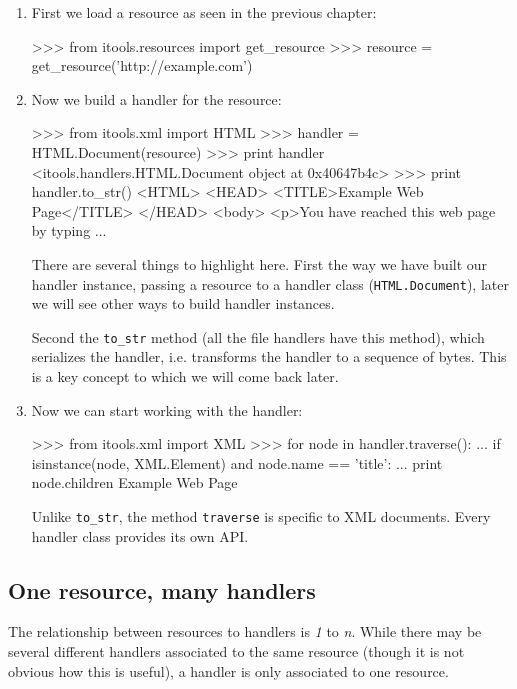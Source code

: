 \begin{enumerate}
  \item First we load a resource as seen in the previous chapter:
\begin{code}
    >>> from itools.resources import get_resource
    >>> resource = get_resource('http://example.com')
\end{code}

  \item Now we build a handler for the resource:
\begin{code}
    >>> from itools.xml import HTML
    >>> handler = HTML.Document(resource)
    >>> print handler
    <itools.handlers.HTML.Document object at 0x40647b4c>
    >>> print handler.to_str()
    <HTML>
    <HEAD>
      <TITLE>Example Web Page</TITLE>
    </HEAD> 
    <body>  
    <p>You have reached this web page by typing
    ...
\end{code}

    There are several things to highlight here. First the way we have built
    our handler instance, passing a resource to a handler class
    ({\tt HTML.Document}), later we will see other ways to build handler
    instances.

    Second the {\tt to\_str} method (all the file handlers have this
    method), which serializes the handler, i.e. transforms the handler to
    a sequence of bytes. This is a key concept to which we will come back
    later.

  \item Now we can start working with the handler:
\begin{code}
    >>> from itools.xml import XML
    >>> for node in handler.traverse():
    ...     if isinstance(node, XML.Element) and node.name == 'title':
    ...         print node.children
    Example Web Page
\end{code}

   Unlike {\tt to\_str}, the method {\tt traverse} is specific to XML
   documents. Every handler class provides its own API.
\end{enumerate}


\subsection{One resource, many handlers}

The relationship between resources to handlers is {\em 1} to {\em n}.
While there may be several different handlers associated to the same
resource (though it is not obvious how this is useful), a handler is
only associated to one resource.

